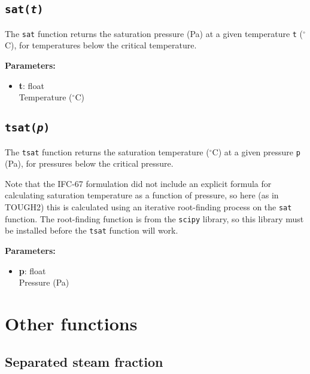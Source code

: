 \begin{snugshade}
\subsection{\texttt{sat(\emph{t})}}
\end{snugshade}
\label{sec:t2thermo:sat}

The \texttt{sat} function returns the saturation pressure (Pa) at a given temperature \texttt{t} ($^{\circ}$C), for temperatures below the critical temperature.

\textbf{Parameters:}
\begin{itemize}
\item \textbf{t}: float\\
  Temperature ($^{\circ}$C)
\end{itemize}

\begin{snugshade}
\subsection{\texttt{tsat(\emph{p})}}
\end{snugshade}
\label{sec:t2thermo:tsat}

The \texttt{tsat} function returns the saturation temperature ($^{\circ}$C) at a given pressure \texttt{p} (Pa), for pressures below the critical pressure.

Note that the IFC-67 formulation did not include an explicit formula for calculating saturation temperature as a function of pressure, so here (as in TOUGH2) this is calculated using an iterative root-finding process on the \texttt{sat} function.  The root-finding function is from the \texttt{scipy} library, so this library must be installed before the \texttt{tsat} function will work.

\textbf{Parameters:}
\begin{itemize}
\item \textbf{p}: float\\
  Pressure (Pa)
\end{itemize}

\section{Other functions}

\subsection{Separated steam fraction}

